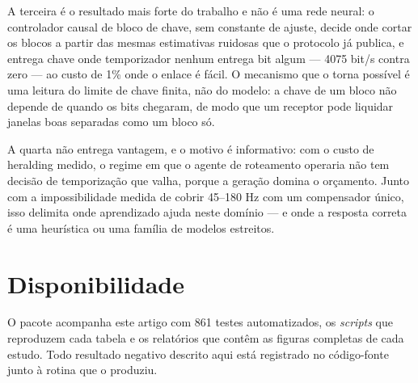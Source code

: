 \documentclass[12pt]{article}
\begin{document}
A terceira é o resultado mais forte do trabalho e não é uma rede neural: o
controlador causal de bloco de chave, sem constante de ajuste, decide onde
cortar os blocos a partir das mesmas estimativas ruidosas que o protocolo já
publica, e entrega chave onde temporizador nenhum entrega bit algum --- 4075
bit/s contra zero --- ao custo de 1\% onde o enlace é fácil. O mecanismo que o
torna possível é uma leitura do limite de chave finita, não do modelo: a chave
de um bloco não depende de quando os bits chegaram, de modo que um receptor
pode liquidar janelas boas separadas como um bloco só.

A quarta não entrega vantagem, e o motivo é informativo: com o custo de
heralding medido, o regime em que o agente de roteamento operaria não tem
decisão de temporização que valha, porque a geração domina o orçamento. Junto
com a impossibilidade medida de cobrir 45--180 Hz com um compensador único, isso
delimita onde aprendizado ajuda neste domínio --- e onde a resposta correta é
uma heurística ou uma família de modelos estreitos.

\section*{Disponibilidade}

O pacote acompanha este artigo com 861 testes automatizados, os \emph{scripts}
que reproduzem cada tabela e os relatórios que contêm as figuras completas de
cada estudo. Todo resultado negativo descrito aqui está registrado no
código-fonte junto à rotina que o produziu.
\end{document}
